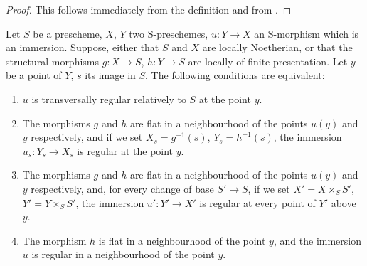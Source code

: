 \begin{proof}
This follows immediately from the definition and from .
\end{proof}

\begin{proposition}[19.2.4]
\label{IV.19.2.4}
Let $S$ be a prescheme, $X$, $Y$ two S-preschemes, $u:Y\to X$ an S-morphism which is an immersion.
Suppose, either that $S$ and $X$ are locally Noetherian, or that the structural morphisms $g:X\to S$, $h:Y\to S$ are locally of finite presentation.
Let $y$ be a point of $Y$, $s$ its image in $S$.
The following conditions are equivalent:
\begin{enumerate}[label=\emph{\alph*)}]
  \item $u$ is transversally regular relatively to $S$ at the point $y$.
  \item The morphisms $g$ and $h$ are flat in a neighbourhood of the points $u(y)$ and $y$ respectively, and if we set $X_s=g^{-1}(s)$, $Y_s=h^{-1}(s)$, the immersion $u_s:Y_s\to X_s$ is regular at the point $y$.
  \item[\rm b$'$)] The morphisms $g$ and $h$ are flat in a neighbourhood of the points $u(y)$ and $y$ respectively, and, for every change of base $S'\to S$, if we set $X'=X\times_S S'$, $Y'=Y\times_S S'$, the immersion $u':Y'\to X'$ is regular at every point of $Y'$ above $y$.
  \item The morphism $h$ is flat in a neighbourhood of the point $y$, and the immersion $u$ is regular in a neighbourhood of the point $y$.
\end{enumerate}
\end{proposition}

